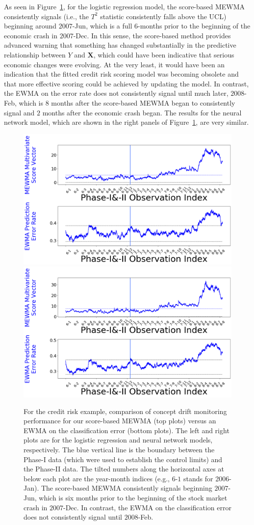 \documentclass[twoside,11pt]{article}
\begin{document}
As seen in Figure~\ref{fig:credit_default}, for the logistic regression model, the score-based MEWMA consistently signals (i.e., the $T^2$ statistic consistently falls above the UCL) beginning around $2007$-Jun, which is a full $6$-months prior to the beginning of the economic crash in $2007$-Dec. In this sense, the score-based method provides advanced warning that something has changed substantially in the predictive relationship between $Y$ and $\bm{X}$, which could have been indicative that serious economic changes were evolving. At the very least, it would have been an indication that the fitted credit risk scoring model was becoming obsolete and that more effective scoring could be achieved by updating the model. In contrast, the EWMA on the error rate does not consistently signal until much later, $2008$-Feb, which is $8$ months after the score-based MEWMA began to consistently signal and $2$ months after the economic crash began. The results for the neural network model, which  are shown in the right panels of Figure~\ref{fig:credit_default}, are very similar. 

\begin{figure}[!htbp]
\centering
\includegraphics[width = 0.49\linewidth]{../figures/v14/credit_default/logi_scal_train_PI/credit_logi_1e-08_0_0001_0_001_99_0.png}
\includegraphics[width = 0.49\linewidth]{../figures/v14/credit_default/logi_nnet_scal_train_PI/credit_logi_0_002_0_0001_0_001_99_0.png}
  \caption{
For the credit risk example, comparison of concept drift monitoring performance for our score-based MEWMA (top plots) versus an EWMA on the classification error (bottom plots). The left and right plots are for the logistic regression and neural network models, respectively. The blue vertical line is the boundary between the Phase-I data (which were used to establish the control limits) and the Phase-II data. The tilted numbers along the horizontal axes at below each plot are the year-month indices (e.g., $6$-$1$ stands for 2006-Jan). The score-based MEWMA consistently signals beginning $2007$-Jun, which is six months prior to the beginning of the stock market crash in $2007$-Dec. In contrast, the EWMA on the classification error does not consistently signal until $2008$-Feb. 
}
\label{fig:credit_default}
\end{figure}
\end{document}
